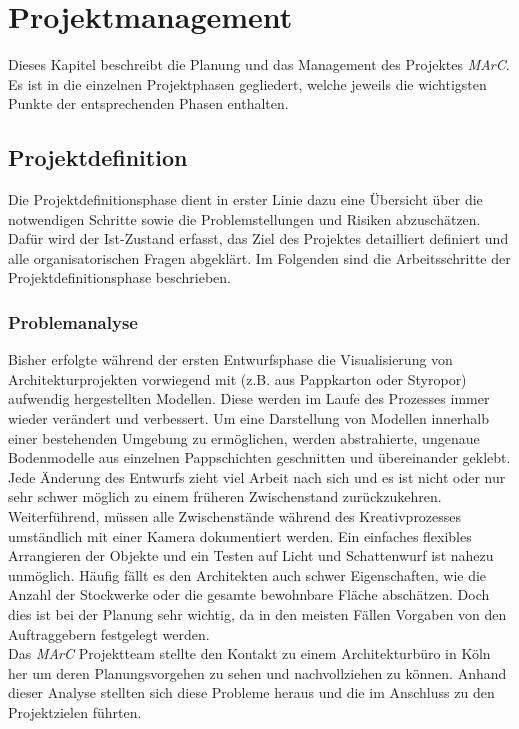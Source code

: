 \section{Projektmanagement} \label{sec:pm}

Dieses Kapitel beschreibt die Planung und das Management des Projektes \textit{MArC}. Es ist in die einzelnen Projektphasen gegliedert, welche jeweils die wichtigsten Punkte der entsprechenden Phasen enthalten.

\subsection{Projektdefinition}
Die Projektdefinitionsphase dient in erster Linie dazu eine Übersicht über die notwendigen Schritte sowie die Problemstellungen und Risiken abzuschätzen. Dafür wird der Ist-Zustand erfasst, das Ziel des Projektes detailliert definiert und alle organisatorischen Fragen abgeklärt. Im Folgenden sind die Arbeitsschritte der Projektdefinitionsphase beschrieben.
\subsubsection{Problemanalyse}
\label{sec:problemanalyse}
Bisher erfolgte während der ersten Entwurfsphase die Visualisierung von Architekturprojekten vorwiegend mit (z.B. aus Pappkarton oder Styropor) aufwendig hergestellten Modellen. Diese werden im Laufe des Prozesses immer wieder verändert und verbessert.
Um eine Darstellung von Modellen innerhalb einer bestehenden Umgebung zu ermöglichen, werden abstrahierte, ungenaue Bodenmodelle aus einzelnen Pappschichten geschnitten und übereinander geklebt. Jede Änderung des Entwurfs zieht viel Arbeit nach sich und es ist nicht oder nur sehr schwer möglich zu einem früheren Zwischenstand zurückzukehren. Weiterführend, müssen alle Zwischenstände während des Kreativprozesses umständlich mit einer Kamera dokumentiert werden. Ein einfaches flexibles Arrangieren der Objekte und ein Testen auf Licht und Schattenwurf ist nahezu unmöglich. Häufig fällt es den Architekten auch schwer Eigenschaften, wie die Anzahl der Stockwerke oder die gesamte bewohnbare Fläche abschätzen. Doch dies ist bei der Planung sehr wichtig, da in den meisten Fällen Vorgaben von den Auftraggebern festgelegt werden.\\
Das \textit{MArC} Projektteam stellte den Kontakt zu einem Architekturbüro in Köln her um deren Planungsvorgehen zu sehen und nachvollziehen zu können. Anhand dieser Analyse stellten sich diese Probleme heraus und die im Anschluss zu den Projektzielen führten.


